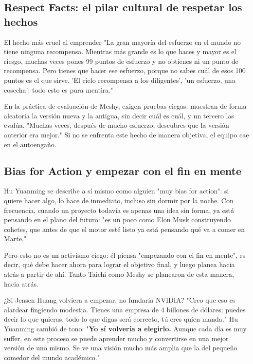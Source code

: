 \documentclass[a4paper]{article}
\begin{document}
\subsection{Respect Facts: el pilar cultural de respetar los hechos}

\begin{warningbox}{El hecho más cruel al emprender}
"La gran mayoría del esfuerzo en el mundo no tiene ninguna recompensa. Mientras más grande es lo que haces y mayor es el riesgo, muchas veces pones 99 puntos de esfuerzo y no obtienes ni un punto de recompensa. Pero tienes que hacer ese esfuerzo, porque no sabes cuál de esos 100 puntos es el que sirve. 'El cielo recompensa a los diligentes', 'un esfuerzo, una cosecha': todo esto es pura mentira."
\end{warningbox}

En la práctica de evaluación de Meshy, exigen pruebas ciegas: muestran de forma aleatoria la versión nueva y la antigua, sin decir cuál es cuál, y un tercero las evalúa. "Muchas veces, después de mucho esfuerzo, descubres que la versión anterior era mejor." Si no se enfrenta este hecho de manera objetiva, el equipo cae en el autoengaño.

\subsection{Bias for Action y empezar con el fin en mente}

Hu Yuanming se describe a sí mismo como alguien "muy bias for action": si quiere hacer algo, lo hace de inmediato, incluso sin dormir por la noche. Con frecuencia, cuando un proyecto todavía es apenas una idea sin forma, ya está pensando en el plano del futuro: "es un poco como Elon Musk construyendo cohetes, que antes de que el motor esté listo ya está pensando qué va a comer en Marte."

Pero esto no es un activismo ciego: él piensa "empezando con el fin en mente", es decir, qué debe hacer ahora para lograr el objetivo final, y luego planea hacia atrás a partir de ahí. Tanto Taichi como Meshy se planearon de esta manera, hacia atrás.

\begin{knowledgebox}{¿Si Jensen Huang volviera a empezar, no fundaría NVIDIA?}
"Creo que eso es alardear fingiendo modestia. Tienes una empresa de 4 billones de dólares; puedes decir lo que quieras, todo lo que digas será correcto, tú eres quien manda." Hu Yuanming cambió de tono: "\textbf{Yo sí volvería a elegirlo.} Aunque cada día es muy suffer, en este proceso se puede aprender mucho y convertirse en una mejor versión de uno mismo. Se ve una visión mucho más amplia que la del pequeño comedor del mundo académico."
\end{knowledgebox}
\end{document}
